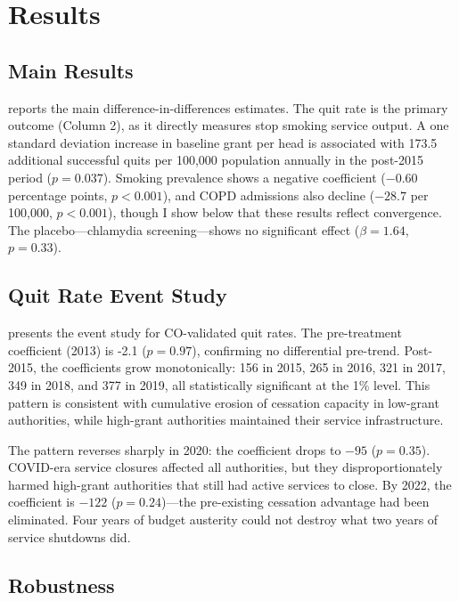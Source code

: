 \documentclass[12pt]{article}
\begin{document}
\section{Results}

\subsection{Main Results}

 reports the main difference-in-differences estimates. The quit rate is the primary outcome (Column 2), as it directly measures stop smoking service output. A one standard deviation increase in baseline grant per head is associated with 173.5 additional successful quits per 100,000 population annually in the post-2015 period ($p = 0.037$). Smoking prevalence shows a negative coefficient ($-0.60$ percentage points, $p < 0.001$), and COPD admissions also decline ($-28.7$ per 100,000, $p < 0.001$), though I show below that these results reflect convergence. The placebo---chlamydia screening---shows no significant effect ($\beta = 1.64$, $p = 0.33$).



\subsection{Quit Rate Event Study}

 presents the event study for CO-validated quit rates. The pre-treatment coefficient (2013) is -2.1 ($p = 0.97$), confirming no differential pre-trend. Post-2015, the coefficients grow monotonically: 156 in 2015, 265 in 2016, 321 in 2017, 349 in 2018, and 377 in 2019, all statistically significant at the 1\% level. This pattern is consistent with cumulative erosion of cessation capacity in low-grant authorities, while high-grant authorities maintained their service infrastructure.

The pattern reverses sharply in 2020: the coefficient drops to $-95$ ($p = 0.35$). COVID-era service closures affected all authorities, but they disproportionately harmed high-grant authorities that still had active services to close. By 2022, the coefficient is $-122$ ($p = 0.24$)---the pre-existing cessation advantage had been eliminated. Four years of budget austerity could not destroy what two years of service shutdowns did.



\subsection{Robustness}
\end{document}
